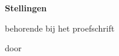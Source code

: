 \begin{center}

{\Large\titlefont\bfseries Stellingen}

\medskip

behorende bij het proefschrift

\medskip

{\makeatletter
\titlestyle\bfseries\large\@title
\makeatother}

{\makeatletter
\ifx\@subtitle\undefined\else
\titlefont\titleshape\@subtitle
\fi
\makeatother}

\medskip

door

\medskip

\makeatletter
{\large\titlefont\bfseries\@firstname\ {\titleshape\@lastname}}
\makeatother

\end{center}

\bigskip

